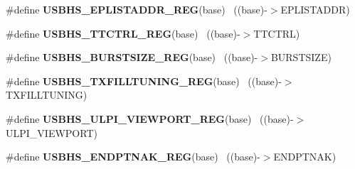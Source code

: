 \begin{DoxyCompactItemize}
\item 
\hypertarget{group___u_s_b_h_s___register___accessor___macros_gad944c9d2e120501832862568e2543c49}{}\#define {\bfseries U\+S\+B\+H\+S\+\_\+\+E\+P\+L\+I\+S\+T\+A\+D\+D\+R\+\_\+\+R\+E\+G}(base)                          ~((base)-\/$>$E\+P\+L\+I\+S\+T\+A\+D\+D\+R)\label{group___u_s_b_h_s___register___accessor___macros_gad944c9d2e120501832862568e2543c49}

\item 
\hypertarget{group___u_s_b_h_s___register___accessor___macros_ga252798c37273fc7792ec9601f41c6e30}{}\#define {\bfseries U\+S\+B\+H\+S\+\_\+\+T\+T\+C\+T\+R\+L\+\_\+\+R\+E\+G}(base)                                  ~((base)-\/$>$T\+T\+C\+T\+R\+L)\label{group___u_s_b_h_s___register___accessor___macros_ga252798c37273fc7792ec9601f41c6e30}

\item 
\hypertarget{group___u_s_b_h_s___register___accessor___macros_ga1ecabd05b2c76a5c0df8d4ec81136faa}{}\#define {\bfseries U\+S\+B\+H\+S\+\_\+\+B\+U\+R\+S\+T\+S\+I\+Z\+E\+\_\+\+R\+E\+G}(base)                            ~((base)-\/$>$B\+U\+R\+S\+T\+S\+I\+Z\+E)\label{group___u_s_b_h_s___register___accessor___macros_ga1ecabd05b2c76a5c0df8d4ec81136faa}

\item 
\hypertarget{group___u_s_b_h_s___register___accessor___macros_ga48ee724cb984d1d2fabb615ad17ddc3f}{}\#define {\bfseries U\+S\+B\+H\+S\+\_\+\+T\+X\+F\+I\+L\+L\+T\+U\+N\+I\+N\+G\+\_\+\+R\+E\+G}(base)                      ~((base)-\/$>$T\+X\+F\+I\+L\+L\+T\+U\+N\+I\+N\+G)\label{group___u_s_b_h_s___register___accessor___macros_ga48ee724cb984d1d2fabb615ad17ddc3f}

\item 
\hypertarget{group___u_s_b_h_s___register___accessor___macros_ga1f940b0e0b67b5c47d7f7470c94be20f}{}\#define {\bfseries U\+S\+B\+H\+S\+\_\+\+U\+L\+P\+I\+\_\+\+V\+I\+E\+W\+P\+O\+R\+T\+\_\+\+R\+E\+G}(base)                    ~((base)-\/$>$U\+L\+P\+I\+\_\+\+V\+I\+E\+W\+P\+O\+R\+T)\label{group___u_s_b_h_s___register___accessor___macros_ga1f940b0e0b67b5c47d7f7470c94be20f}

\item 
\hypertarget{group___u_s_b_h_s___register___accessor___macros_ga8c50a225b19ba70cd7d26c63bbf3bdaa}{}\#define {\bfseries U\+S\+B\+H\+S\+\_\+\+E\+N\+D\+P\+T\+N\+A\+K\+\_\+\+R\+E\+G}(base)                              ~((base)-\/$>$E\+N\+D\+P\+T\+N\+A\+K)\label{group___u_s_b_h_s___register___accessor___macros_ga8c50a225b19ba70cd7d26c63bbf3bdaa}


\end{DoxyCompactItemize}
